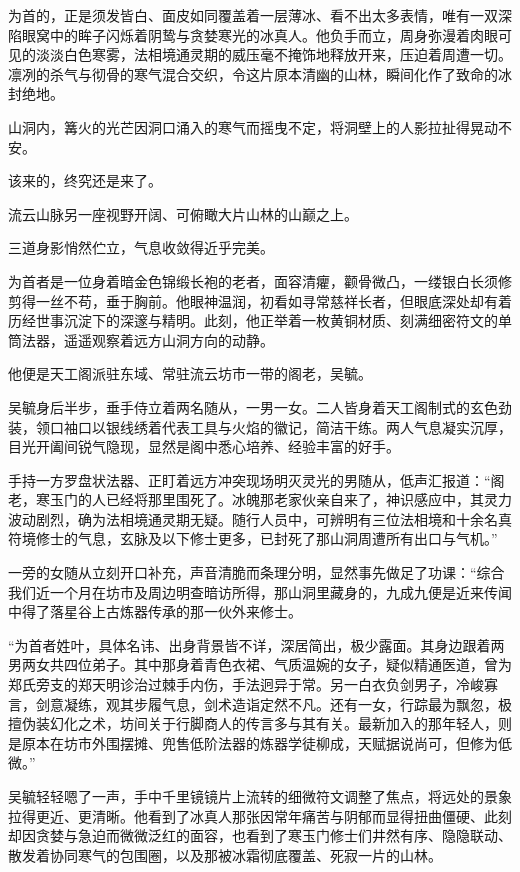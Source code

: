 为首的，正是须发皆白、面皮如同覆盖着一层薄冰、看不出太多表情，唯有一双深陷眼窝中的眸子闪烁着阴鸷与贪婪寒光的冰真人。他负手而立，周身弥漫着肉眼可见的淡淡白色寒雾，法相境通灵期的威压毫不掩饰地释放开来，压迫着周遭一切。凛冽的杀气与彻骨的寒气混合交织，令这片原本清幽的山林，瞬间化作了致命的冰封绝地。

山洞内，篝火的光芒因洞口涌入的寒气而摇曳不定，将洞壁上的人影拉扯得晃动不安。

该来的，终究还是来了。

\vspace{2em}

流云山脉另一座视野开阔、可俯瞰大片山林的山巅之上。

三道身影悄然伫立，气息收敛得近乎完美。

为首者是一位身着暗金色锦缎长袍的老者，面容清癯，颧骨微凸，一缕银白长须修剪得一丝不苟，垂于胸前。他眼神温润，初看如寻常慈祥长者，但眼底深处却有着历经世事沉淀下的深邃与精明。此刻，他正举着一枚黄铜材质、刻满细密符文的单筒法器，遥遥观察着远方山洞方向的动静。

他便是天工阁派驻东域、常驻流云坊市一带的阁老，吴毓。

吴毓身后半步，垂手侍立着两名随从，一男一女。二人皆身着天工阁制式的玄色劲装，领口袖口以银线绣着代表工具与火焰的徽记，简洁干练。两人气息凝实沉厚，目光开阖间锐气隐现，显然是阁中悉心培养、经验丰富的好手。

手持一方罗盘状法器、正盯着远方冲突现场明灭灵光的男随从，低声汇报道：“阁老，寒玉门的人已经将那里围死了。冰魄那老家伙亲自来了，神识感应中，其灵力波动剧烈，确为法相境通灵期无疑。随行人员中，可辨明有三位法相境和十余名真符境修士的气息，玄脉及以下修士更多，已封死了那山洞周遭所有出口与气机。”

一旁的女随从立刻开口补充，声音清脆而条理分明，显然事先做足了功课：“综合我们近一个月在坊市及周边明查暗访所得，那山洞里藏身的，九成九便是近来传闻中得了落星谷上古炼器传承的那一伙外来修士。

“为首者姓叶，具体名讳、出身背景皆不详，深居简出，极少露面。其身边跟着两男两女共四位弟子。其中那身着青色衣裙、气质温婉的女子，疑似精通医道，曾为郑氏旁支的郑天明诊治过棘手内伤，手法迥异于常。另一白衣负剑男子，冷峻寡言，剑意凝练，观其步履气息，剑术造诣定然不凡。还有一女，行踪最为飘忽，极擅伪装幻化之术，坊间关于行脚商人的传言多与其有关。最新加入的那年轻人，则是原本在坊市外围摆摊、兜售低阶法器的炼器学徒柳成，天赋据说尚可，但修为低微。”

吴毓轻轻嗯了一声，手中千里镜镜片上流转的细微符文调整了焦点，将远处的景象拉得更近、更清晰。他看到了冰真人那张因常年痛苦与阴郁而显得扭曲僵硬、此刻却因贪婪与急迫而微微泛红的面容，也看到了寒玉门修士们井然有序、隐隐联动、散发着协同寒气的包围圈，以及那被冰霜彻底覆盖、死寂一片的山林。


